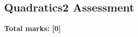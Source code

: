 \documentclass[../c1]{subfiles}
\begin{document}
\subsection*{Quadratics2 Assessment}
\thispagestyle{fancy}



\begin{flushright}
\textbf{Total marks: [0]}
\end{flushright}
\end{document}
